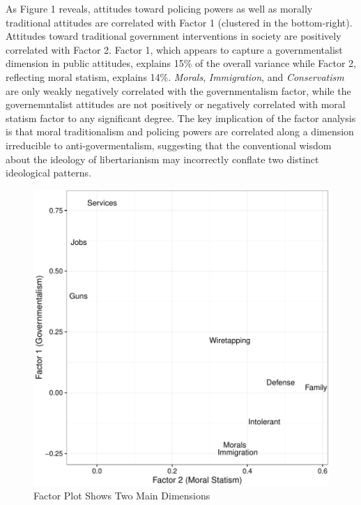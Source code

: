\documentclass[12pt,]{article}
\begin{document}
As Figure 1 reveals, attitudes toward policing powers as well as morally
traditional attitudes are correlated with Factor 1 (clustered in the
bottom-right). Attitudes toward traditional government interventions in
society are positively correlated with Factor 2. Factor 1, which appears
to capture a governmentalist dimension in public attitudes, explains
15\% of the overall variance while Factor 2, reflecting moral statism,
explains 14\%. \emph{Morals}, \emph{Immigration}, and
\emph{Conservatism} are only weakly negatively correlated with the
governmentalism factor, while the governemntalist attitudes are not
positively or negatively correlated with moral statism factor to any
significant degree. The key implication of the factor analysis is that
moral traditionalism and policing powers are correlated along a
dimension irreducible to anti-govermentalism, suggesting that the
conventional wisdom about the ideology of libertarianism may incorrectly
conflate two distinct ideological patterns.

\begin{figure}[htbp]
\centering
\includegraphics{figures/factorplot-1.pdf}
\caption{Factor Plot Shows Two Main Dimensions}
\end{figure}
\end{document}
